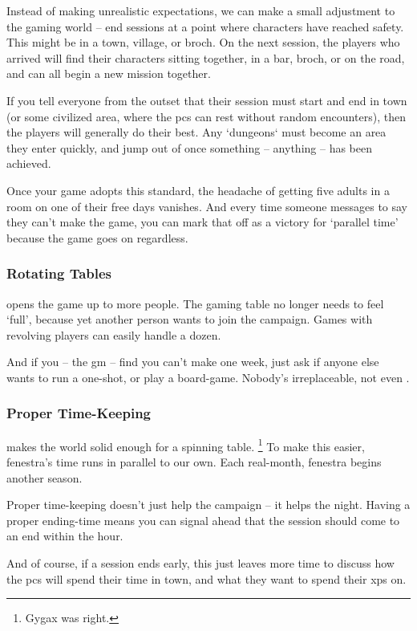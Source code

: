 \begin{multicols}{2}
Instead of making unrealistic expectations, we can make a small adjustment to the gaming world -- end sessions at a point where characters have reached safety.
This might be in a town, \gls{village}, or \gls{broch}.
On the next session, the players who arrived will find their characters sitting together, in a bar, \gls{broch}, or on the road, and can all begin a new mission together.

If you tell everyone from the outset that their session must start and end in town (or some civilized area, where the \glspl{pc} can rest without random encounters), then the players will generally do their best.
Any `dungeons` must become an area they enter quickly, and jump out of once something -- anything -- has been achieved.

Once your game adopts this standard, the headache of getting five adults in a room on one of their free days vanishes.
And every time someone messages to say they can't make the game, you can mark that off as a victory for `parallel time' because the game goes on regardless.

\subsubsection{Rotating Tables}
opens the game up to more people.
The gaming table no longer needs to feel `full', because yet another person wants to join the campaign.
Games with revolving players can easily handle a dozen.

And if you -- the \gls{gm} -- find you can't make one week, just ask if anyone else wants to run a one-shot, or play a board-game.
Nobody's irreplaceable, not even .

\subsubsection{Proper Time-Keeping}
makes the world solid enough for a spinning table.
\footnote{Gygax was right.}
To make this easier, \gls{fenestra}'s time runs in parallel to our own.
Each real-month, \gls{fenestra} begins another season.

Proper time-keeping doesn't just help the \gls{campaign} -- it helps the night.
Having a proper ending-time means you can signal ahead that the session should come to an end within the hour.

And of course, if a session ends early, this just leaves more time to discuss how the \glspl{pc} will spend their time in town, and what they want to spend their \glspl{xp} on.


\end{multicols}
